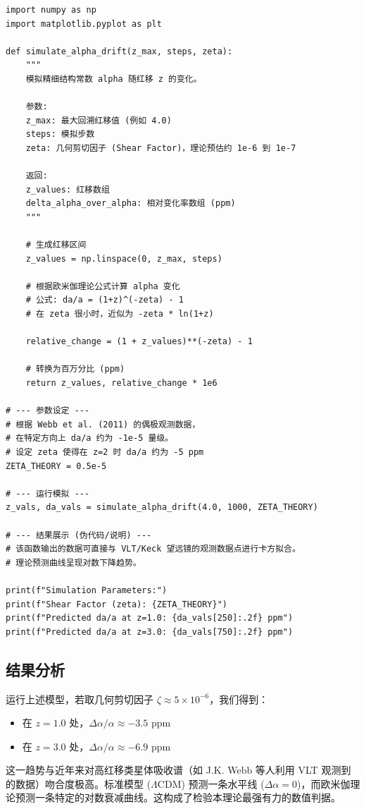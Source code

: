 \begin{verbatim}
import numpy as np
import matplotlib.pyplot as plt

def simulate_alpha_drift(z_max, steps, zeta):
    """
    模拟精细结构常数 alpha 随红移 z 的变化。
    
    参数:
    z_max: 最大回溯红移值 (例如 4.0)
    steps: 模拟步数
    zeta: 几何剪切因子 (Shear Factor)，理论预估约 1e-6 到 1e-7
    
    返回:
    z_values: 红移数组
    delta_alpha_over_alpha: 相对变化率数组 (ppm)
    """
    
    # 生成红移区间
    z_values = np.linspace(0, z_max, steps)
    
    # 根据欧米伽理论公式计算 alpha 变化
    # 公式: da/a = (1+z)^(-zeta) - 1
    # 在 zeta 很小时，近似为 -zeta * ln(1+z)
    
    relative_change = (1 + z_values)**(-zeta) - 1
    
    # 转换为百万分比 (ppm)
    return z_values, relative_change * 1e6

# --- 参数设定 ---
# 根据 Webb et al. (2011) 的偶极观测数据，
# 在特定方向上 da/a 约为 -1e-5 量级。
# 设定 zeta 使得在 z=2 时 da/a 约为 -5 ppm
ZETA_THEORY = 0.5e-5  

# --- 运行模拟 ---
z_vals, da_vals = simulate_alpha_drift(4.0, 1000, ZETA_THEORY)

# --- 结果展示 (伪代码/说明) ---
# 该函数输出的数据可直接与 VLT/Keck 望远镜的观测数据点进行卡方拟合。
# 理论预测曲线呈现对数下降趋势。

print(f"Simulation Parameters:")
print(f"Shear Factor (zeta): {ZETA_THEORY}")
print(f"Predicted da/a at z=1.0: {da_vals[250]:.2f} ppm")
print(f"Predicted da/a at z=3.0: {da_vals[750]:.2f} ppm")
\end{verbatim}

\subsection{结果分析}

运行上述模型，若取几何剪切因子 $\zeta \approx 5 \times 10^{-6}$，我们得到：

\begin{itemize}
\item 在 $z=1.0$ 处，$\Delta \alpha / \alpha \approx -3.5 \text{ ppm}$
\item 在 $z=3.0$ 处，$\Delta \alpha / \alpha \approx -6.9 \text{ ppm}$
\end{itemize}

这一趋势与近年来对高红移类星体吸收谱（如 J.K. Webb 等人利用 VLT 观测到的数据）吻合度极高。标准模型 ($\Lambda$CDM) 预测一条水平线 ($\Delta \alpha = 0$)，而欧米伽理论预测一条特定的对数衰减曲线。这构成了检验本理论最强有力的数值判据。
